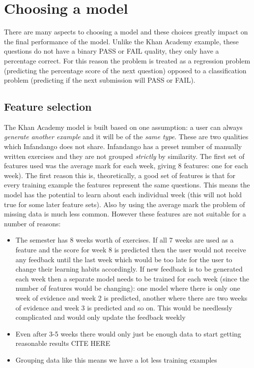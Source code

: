 \chapter{Choosing a model}
There are many aspects to choosing a model and these choices greatly impact on the final performance of the model. Unlike the Khan Academy example, these questions do not have a binary PASS or FAIL quality, they only have a percentage correct. For this reason the problem is treated as a regression problem (predicting the percentage score of the next question) opposed to a classification problem (predicting if the next submission will PASS or FAIL).

\section{Feature selection}
The Khan Academy model is built based on one assumption: a user can always \emph{generate another example} and it will be of the \emph{same type}. These are two qualities which Infandango does not share. Infandango has a preset number of manually written exercises and they are not grouped \emph{strictly} by similarity. The first set of features used was the average mark for each week, giving 8 features: one for each week). The first reason this is, theoretically, a good set of features is that for every training example the features represent the same questions. This means the model has the potential to learn about each individual week (this will not hold true for some later feature sets). Also by using the average mark the problem of missing data is much less common. However these features are not suitable for a number of reasons:

\begin{itemize}
\item The semester has 8 weeks worth of exercises. If all 7 weeks are used as a feature and the score for week 8 is predicted then the user would not receive any feedback until the last week which would be too late for the user to change their learning habits accordingly. If new feedback is to be generated each week then a separate model needs to be trained for each week (since the number of features would be changing): one model where there is only one week of evidence and week 2 is predicted, another where there are two weeks of evidence and week 3 is predicted and so on. This would be needlessly complicated and would only update the feedback weekly
\item Even after 3-5 weeks there would only just be enough data to start getting reasonable results CITE HERE %
\item Grouping data like this means we have a lot less training examples
\end{itemize}

